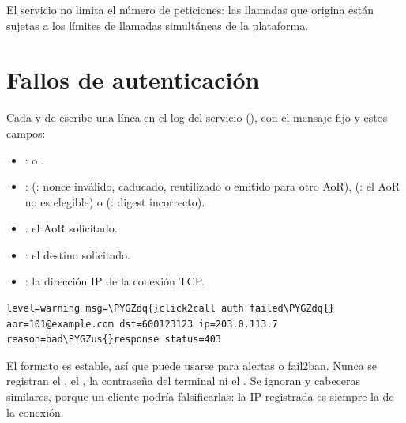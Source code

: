 \documentclass[letterpaper,10pt,spanish]{sphinxmanual}
\def\PYGZus{\char`\_}
\def\PYGZdq{\char`\"}
\begin{document}
El servicio no limita el número de peticiones: las llamadas que origina están sujetas a los límites de llamadas simultáneas de la plataforma.


\section{Fallos de autenticación}
\label{api_rest/click2call:authentication-failures}
Cada  y  de  escribe una línea  en el log del servicio (), con el mensaje fijo  y estos campos:
\begin{itemize}
\item {} 
:  o .

\item {} 
:  (: nonce inválido, caducado, reutilizado o emitido para otro AoR),  (: el AoR no es elegible) o  (: digest incorrecto).

\item {} 
: el AoR solicitado.

\item {} 
: el destino solicitado.

\item {} 
: la dirección IP de la conexión TCP.

\end{itemize}

\begin{Verbatim}[commandchars=\\\{\}]
level=warning msg=\PYGZdq{}click2call auth failed\PYGZdq{} aor=101@example.com dst=600123123 ip=203.0.113.7 reason=bad\PYGZus{}response status=403
\end{Verbatim}

El formato es estable, así que puede usarse para alertas o fail2ban. Nunca se registran el , el , la contraseña del terminal ni el . Se ignoran  y cabeceras similares, porque un cliente podría falsificarlas: la IP registrada es siempre la de la conexión.
\end{document}
